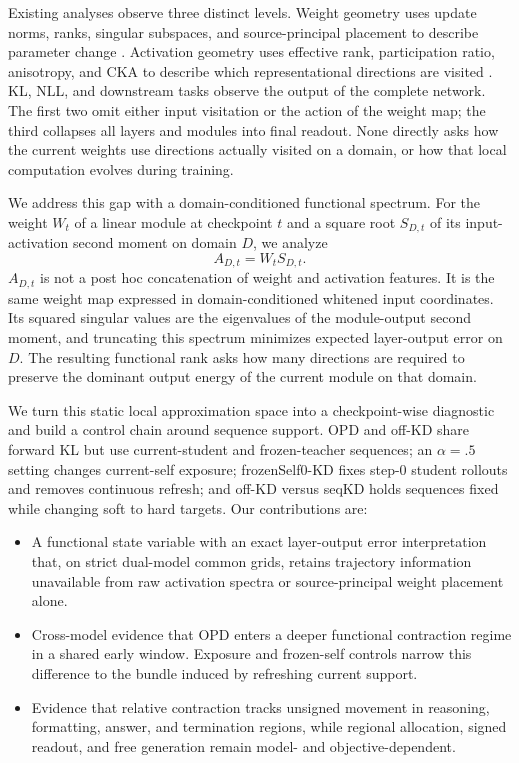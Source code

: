 \documentclass[letterpaper]{article} %
\begin{document}
Existing analyses observe three distinct levels. Weight geometry uses update norms, ranks, singular subspaces, and source-principal placement to describe parameter change \citep{shuttleworth2024lora,zhu2025path,yu2026dense,shen2026geometryopd}. Activation geometry uses effective rank, participation ratio, anisotropy, and CKA to describe which representational directions are visited \citep{liu2026collapse}. KL, NLL, and downstream tasks observe the output of the complete network. The first two omit either input visitation or the action of the weight map; the third collapses all layers and modules into final readout. None directly asks how the current weights use directions actually visited on a domain, or how that local computation evolves during training.

We address this gap with a domain-conditioned functional spectrum. For the weight $W_t$ of a linear module at checkpoint $t$ and a square root $S_{D,t}$ of its input-activation second moment on domain $D$, we analyze
\begin{equation}
A_{D,t}=W_tS_{D,t}.
\label{eq:intro-state}
\end{equation}
$A_{D,t}$ is not a post hoc concatenation of weight and activation features. It is the same weight map expressed in domain-conditioned whitened input coordinates. Its squared singular values are the eigenvalues of the module-output second moment, and truncating this spectrum minimizes expected layer-output error on $D$. The resulting functional rank asks how many directions are required to preserve the dominant output energy of the current module on that domain.

We turn this static local approximation space into a checkpoint-wise diagnostic and build a control chain around sequence support. OPD and off-KD share forward KL but use current-student and frozen-teacher sequences; an $\alpha=.5$ setting changes current-self exposure; frozenSelf0-KD fixes step-0 student rollouts and removes continuous refresh; and off-KD versus seqKD holds sequences fixed while changing soft to hard targets. Our contributions are:
\begin{itemize}
    \item A functional state variable with an exact layer-output error interpretation that, on strict dual-model common grids, retains trajectory information unavailable from raw activation spectra or source-principal weight placement alone.
    \item Cross-model evidence that OPD enters a deeper functional contraction regime in a shared early window. Exposure and frozen-self controls narrow this difference to the bundle induced by refreshing current support.
    \item Evidence that relative contraction tracks unsigned movement in reasoning, formatting, answer, and termination regions, while regional allocation, signed readout, and free generation remain model- and objective-dependent.
\end{itemize}
\end{document}
